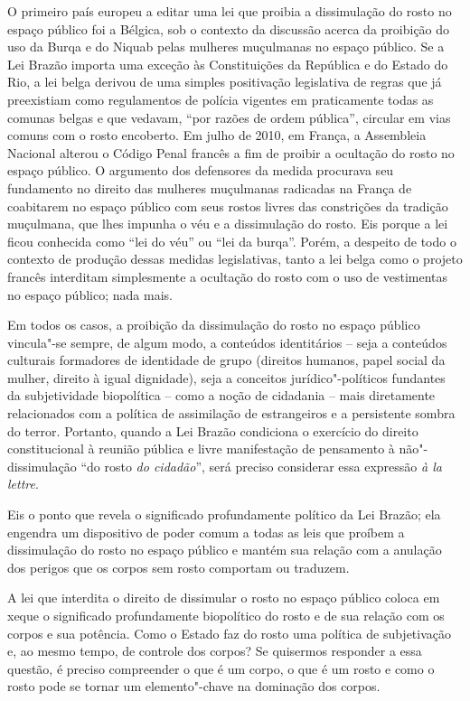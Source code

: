 O primeiro país europeu a editar uma lei que proibia a dissimulação do
rosto no espaço público foi a Bélgica, sob o contexto da discussão
acerca da proibição do uso da Burqa e do Niquab pelas mulheres
muçulmanas no espaço público. Se a Lei Brazão importa uma exceção às
Constituições da República e do Estado do Rio, a lei belga derivou de
uma simples positivação legislativa de regras que já preexistiam como
regulamentos de polícia vigentes em praticamente todas as comunas belgas
e que vedavam, ``por razões de ordem pública'', circular em vias comuns
com o rosto encoberto. Em julho de 2010, em França, a Assembleia
Nacional alterou o Código Penal francês a fim de proibir a ocultação do
rosto no espaço público. O argumento dos defensores da medida procurava
seu fundamento no direito das mulheres muçulmanas radicadas na França de
coabitarem no espaço público com seus rostos livres das constrições da
tradição muçulmana, que lhes impunha o véu e a dissimulação do rosto.
Eis porque a lei ficou conhecida como ``lei do véu'' ou ``lei da
burqa''. Porém, a despeito de todo o contexto de produção dessas medidas
legislativas, tanto a lei belga como o projeto francês interditam
simplesmente a ocultação do rosto com o uso de vestimentas no espaço
público; nada mais.

Em todos os casos, a proibição da dissimulação do rosto no espaço
público vincula"-se sempre, de algum modo, a conteúdos identitários --
seja a conteúdos culturais formadores de identidade de grupo (direitos
humanos, papel social da mulher, direito à igual dignidade), seja a
conceitos jurídico"-políticos fundantes da subjetividade biopolítica --
como a noção de cidadania -- mais diretamente relacionados com a
política de assimilação de estrangeiros e a persistente sombra do
terror. Portanto, quando a Lei Brazão condiciona o exercício do direito
constitucional à reunião pública e livre manifestação de pensamento à
não"-dissimulação ``do rosto \emph{do cidadão}'', será preciso considerar
essa expressão \emph{à la lettre}.

Eis o ponto que revela o significado profundamente político da Lei
Brazão; ela engendra um dispositivo de poder comum a todas as leis que
proíbem a dissimulação do rosto no espaço público e mantém sua relação
com a anulação dos perigos que os corpos sem rosto comportam ou
traduzem.

A lei que interdita o direito de dissimular o rosto no espaço público
coloca em xeque o significado profundamente biopolítico do rosto e de
sua relação com os corpos e sua potência. Como o Estado faz do rosto uma
política de subjetivação e, ao mesmo tempo, de controle dos corpos? Se
quisermos responder a essa questão, é preciso compreender o que é um
corpo, o que é um rosto e como o rosto pode se tornar um elemento"-chave
na dominação dos corpos.

